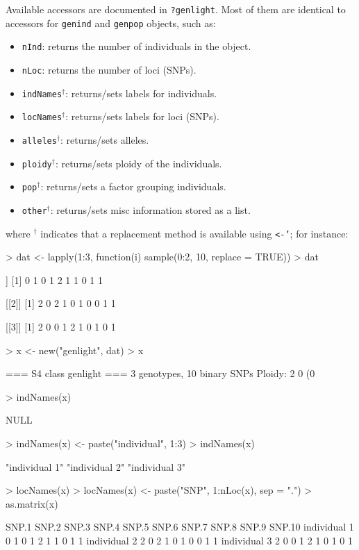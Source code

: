 \documentclass{article}
\newcommand{\code}[1]{{{\tt #1}}}
\begin{document}
Available accessors are documented in \code{?genlight}.
Most of them are identical to accessors for \texttt{genind} and \texttt{genpop} objects, such as:
\begin{itemize}
  \item \texttt{nInd}: returns the number of individuals in the object.
  \item \texttt{nLoc}: returns the number of loci (SNPs).
  \item \texttt{indNames}$^{\dagger}$: returns/sets labels for individuals.
  \item \texttt{locNames}$^{\dagger}$: returns/sets labels for loci (SNPs).
  \item \texttt{alleles}$^{\dagger}$: returns/sets alleles.
  \item \texttt{ploidy}$^{\dagger}$: returns/sets ploidy of the individuals.
  \item \texttt{pop}$^{\dagger}$: returns/sets a factor grouping individuals.
  \item \texttt{other}$^{\dagger}$: returns/sets misc information stored as a list.
\end{itemize}
where $^{\dagger}$ indicates that a replacement method is available using \texttt{<-'}; for instance:
\begin{Schunk}
\begin{Sinput}
> dat <- lapply(1:3, function(i) sample(0:2, 10, replace = TRUE))
> dat
\end{Sinput}
\begin{Soutput}
[[1]]
 [1] 0 1 0 1 2 1 1 0 1 1

[[2]]
 [1] 2 0 2 1 0 1 0 0 1 1

[[3]]
 [1] 2 0 0 1 2 1 0 1 0 1
\end{Soutput}
\begin{Sinput}
> x <- new("genlight", dat)
> x
\end{Sinput}
\begin{Soutput}
 === S4 class genlight ===
 3 genotypes,  10 binary SNPs
 Ploidy: 2
 0 (0 %) missing data
\end{Soutput}
\begin{Sinput}
> indNames(x)
\end{Sinput}
\begin{Soutput}
NULL
\end{Soutput}
\begin{Sinput}
> indNames(x) <- paste("individual", 1:3)
> indNames(x)
\end{Sinput}
\begin{Soutput}
[1] "individual 1" "individual 2" "individual 3"
\end{Soutput}
\begin{Sinput}
> locNames(x)
> locNames(x) <- paste("SNP", 1:nLoc(x), sep = ".")
> as.matrix(x)
\end{Sinput}
\begin{Soutput}
             SNP.1 SNP.2 SNP.3 SNP.4 SNP.5 SNP.6 SNP.7 SNP.8 SNP.9 SNP.10
individual 1     0     1     0     1     2     1     1     0     1      1
individual 2     2     0     2     1     0     1     0     0     1      1
individual 3     2     0     0     1     2     1     0     1     0      1
\end{Soutput}
\end{Schunk}
\end{document}
